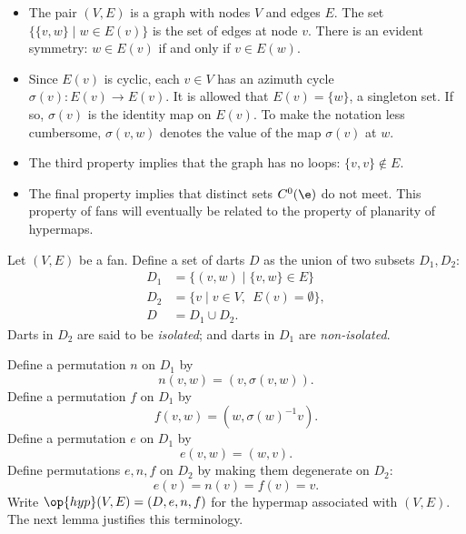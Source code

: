 \begin{remark}
\begin{itemize}
\item The pair $(V,E)$ is a graph with nodes $V$ and edges $E$.  The set
$\{\{v,w\}\mid w\in E(v)\}$ is the set of edges at node $v$.
There is an evident symmetry:  $w\in E(v)$ if and only if $v\in E(w)$.   
%
\item
Since $E(v)$ is cyclic,
each $v\in V$ has an azimuth cycle $\sigma(v):E(v)\to E(v)$.
It is allowed that $E(v) = \{w\}$,  a
%
singleton set. If so,
$\sigma(v)$ is the identity map on $E(v)$.
%
To make the notation less cumbersome, $\sigma(v,w)$ denotes the value of the map $\sigma(v)$ at $w$.
%
\item 
The third property implies that the graph has no loops: $\{v,v\}\not\in E$.
%
\item The final property implies that distinct sets $C^0(\e)$
do not meet.   This property of fans will eventually be related to  the property of planarity of hypermaps.
%
%
%
\end{itemize}
\end{remark}


Let $(V,E)$ be a fan.  Define a set of darts $D$ as the union of
two subsets $D_1,D_2$:
    $$
    \begin{array}{lll}
    D_1 &= \{(v,w)\mid \{v,w\}\in E\}\\
    D_2 &= \{v \mid v\in V,\ \ E(v) = \emptyset\},\\
    D   &= D_1\cup D_2.
    \end{array}
    $$
Darts in $D_2$ are said to be {\it isolated}; and darts in $D_1$ are {\it non-isolated}.
%
%
%
%
%
%
%

Define a permutation $n$ on $D_1$ by
    $$n(v,w) = (v,\sigma(v,w)).$$
Define a permutation $f$ on $D_1$ by
    $$
    f (v,w) = (w,\sigma(w)^{-1} v).
    $$
Define a permutation $e$ on $D_1$ by
    $$
    e (v,w) = (w,v).
    $$
Define permutations $e,n,f$ on $D_2$ by making them degenerate on $D_2$:
    $$
    e (v) = n(v) = f(v) = v.
    $$
Write %
$\op{hyp}(V,E)=(D,e,n,f)$ for %
the hypermap associated with $(V,E)$.  The next
lemma justifies this terminology.



